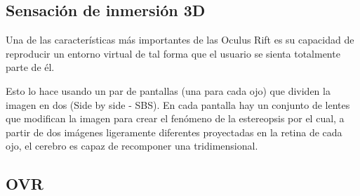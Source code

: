 \documentclass[twoside, 11pt]{epstfg}
\begin{document}
%
%
%
%
%
%
%
%
%
%
%

\subsection{Sensación de inmersión 3D}

Una de las características más importantes de las Oculus Rift es su capacidad de reproducir un entorno virtual de tal forma que el usuario se sienta totalmente parte de él.

Esto lo hace usando un par de pantallas (una para cada ojo) que dividen la imagen en dos (Side by side - SBS). En cada pantalla hay un conjunto de lentes que modifican la imagen para crear el fenómeno de la estereopsis por el cual, a partir de dos imágenes ligeramente diferentes proyectadas en la retina de cada ojo, el cerebro es capaz de recomponer una tridimensional.

\subsection{OVR}\label{subsec::OVR}
\end{document}
